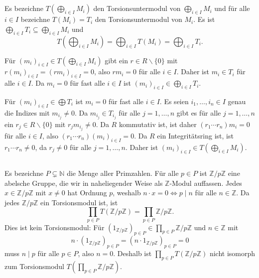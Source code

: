 \documentclass[a4paper,10pt]{article}
\theoremstyle{definition}
\newcommand{\N}{\mathbb{N}}
\newcommand{\Z}{\mathbb{Z}}
\begin{document}
\section{}


\subsection{}
Es bezeichne $T(\bigoplus_{i \in I} M_i)$ den Torsionsuntermodul von $\bigoplus_{i \in I} M_i$ und für alle $i \in I$ bezeichne $T(M_i) = T_i$ den Torsionsuntermodul von $M_i$. Es ist $\bigoplus_{i \in I} T_i \subseteq \bigoplus_{i \in I} M_i$ und
\[
 T\left( \bigoplus_{i \in I} M_i \right) = \bigoplus_{i \in I} T(M_i) = \bigoplus_{i \in I} T_i.
\]

Für $(m_i)_{i \in I} \in T\left( \bigoplus_{i \in I} M_i \right)$ gibt ein $r \in R \smallsetminus \{0\}$ mit $r(m_i)_{i \in I} = (rm_{i})_{i \in I} = 0$, also $rm_i = 0$ für alle $i \in I$. Daher ist $m_i \in T_i$ für alle $i \in I$. Da $m_i = 0$ für fast alle $i \in I$ ist $(m_i)_{i \in I} \in \bigoplus_{i \in I} T_i$.

Für $(m_i)_{i \in I} \in \bigoplus T_i$ ist $m_i = 0$ für fast alle $i \in I$. Es seien $i_1, \ldots, i_n \in I$ genau die Indizes mit $m_{i_j} \neq 0$. Da $m_{i_j} \in T_{i_j}$ für alle $j=1,\ldots,n$ gibt es für alle $j=1,\ldots,n$ ein $r_j \in R \smallsetminus \{0\}$ mit $r_j m_{i_j} \neq 0$. Da $R$ kommutativ ist, ist daher $(r_1 \cdots r_n) m_i = 0$ für alle $i \in I$, also $(r_1 \cdots r_n) (m_i)_{i \in I} = 0$. Da $R$ ein Integritätsring ist, ist $r_1 \cdots r_n \neq 0$, da $r_j \neq 0$ für alle $j=1,\ldots,n$. Daher ist $(m_i)_{i \in I} \in T(\bigoplus_{i \in I} M_i)$.


\subsection{}
Es bezeichne $P \subsetneq \N$ die Menge aller Primzahlen. Für alle $p \in P$ ist $\Z/p\Z$ eine abelsche Gruppe, die wir in naheliegender Weise als $\Z$-Modul auffassen. Jedes $x \in \Z/p\Z$ mit $x \neq 0$ hat Ordnung $p$, weshalb $n \cdot x = 0 \Leftrightarrow p \mid n$ für alle $n \in \Z$. Da jedes $\Z/p\Z$ ein Torsionsmodul ist, ist
\[
 \prod_{p \in P} T(\Z/p\Z) = \prod_{p \in P} \Z/p\Z.
\]
Dies ist kein Torsionsmodul: Für $(1_{\Z/p\Z})_{p \in P} \in \prod_{p \in P} \Z/p\Z$ und $n \in \Z$ mit
\[
 n \cdot (1_{\Z/p\Z})_{p \in P} = (n \cdot 1_{\Z/p\Z})_{p \in P} = 0
\]
muss $n \mid p$ für alle $p \in P$, also $n = 0$. Deshalb ist $\prod_{p \in P} T(\Z/p\Z)$ nicht isomorph zum Torsionsmodul $T(\prod_{p \in P} \Z/p\Z)$.
\end{document}
